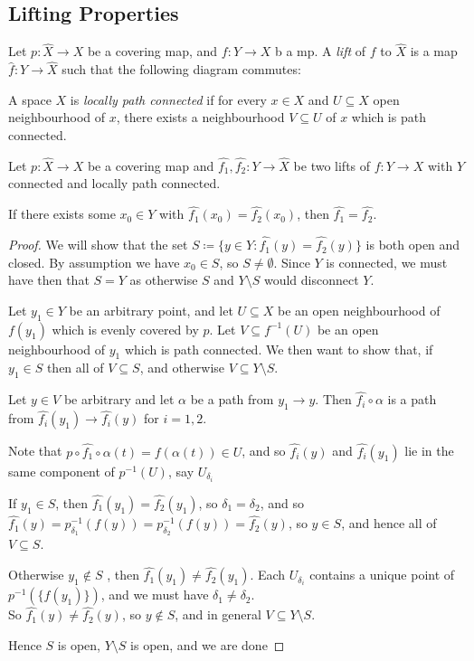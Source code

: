 \documentclass[10pt,a4paper]{article}
\begin{document}
\subsection*{Lifting Properties}
Let $p:\hat{X} \rightarrow X$ be a covering map, and $f:Y\rightarrow X$ b a mp. A \emph{lift} of $f$ to $\hat{X}$ is a map $\hat{f}:Y\rightarrow \hat{X}$ such that the following diagram commutes:
\begin{center}
\end{center}
A space $X$ is \emph{locally path connected} if for every $x\in X$ and $U \subseteq X$ open neighbourhood of $x$, there exists a neighbourhood $V\subseteq U$ of $x$ which is path connected.

\begin{lemma}
Let $p:\hat{X}\rightarrow X$ be a covering map and $\hat{f_1}, \hat{f_2}:Y\rightarrow \hat{X}$ be two lifts of $f:Y\rightarrow X$ with $Y$ connected and locally path connected. 

If there exists some $x_0 \in Y$ with $\hat{f_1}(x_0) = \hat{f_2}(x_0)$, then $\hat{f_1} = \hat{f_2}$.
\end{lemma}
\begin{proof}
We will show that the set $S \coloneqq \{y\in Y : \hat{f_1}(y) = \hat{f_2}(y)\}$ is both open and closed. By assumption we have $x_0 \in S$, so $S \neq \emptyset$. Since $Y$ is connected, we must have then that $S = Y$ as otherwise $S$ and $Y\setminus S$ would disconnect $Y$.

Let $y_1 \in Y$ be an arbitrary point, and let $U\subseteq X$ be an open neighbourhood of $f(y_1)$ which is evenly covered by $p$. Let $V\subseteq f^{-1}(U)$ be an open neighbourhood of $y_1$ which is path connected. We then want to show that, if $y_1 \in S$ then all of $V \subseteq S$, and otherwise $V \subseteq Y\setminus S$.

Let $y\in V$ be arbitrary and let $\alpha$ be a path from $y_1 \rightarrow y$. Then $\hat{f_i}\circ \alpha$ is a path from $\hat{f_i}(y_1) \rightarrow \hat{f_i}(y)$ for $i=1,2$.

Note that $p\circ \hat{f_1} \circ \alpha(t) = f(\alpha(t)) \in U$, and so $\hat{f_i}(y)$ and $\hat{f_i}(y_1)$ lie in the same component of $p^{-1}(U)$, say $U_{\delta_i}$

If $y_1 \in S$, then $\hat{f_1}(y_1) = \hat{f_2}(y_1)$, so $\delta_1 = \delta_2$, and so $\hat{f_1}(y) = p^{-1}_{\delta_1}(f(y)) = p^{-1}_{\delta_2}(f(y)) = \hat{f_2}(y)$, so $y\in S$, and hence all of $V \subseteq S$.

Otherwise $y_1\notin S$ , then $\hat{f_1}(y_1) \neq \hat{f_2}(y_1)$. Each $U_{\delta_i}$ contains a unique point of $p^{-1}(\{f(y_1)\})$, and we must have $\delta_1 \neq \delta_2$.\\
So $\hat{f_1}(y) \neq \hat{f_2}(y)$, so $y\notin S$, and in general $V\subseteq Y\setminus S$.

Hence $S$ is open, $Y\setminus S$ is open, and we are done
\end{proof}
\end{document}
